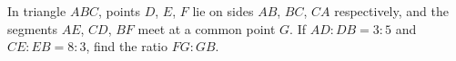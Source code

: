 In triangle $ABC$, points $D$, $E$, $F$ lie on sides $AB$, $BC$, $CA$ respectively, and the segments $AE$, $CD$, $BF$ meet at a common point $G$. If $AD:DB=3:5$ and $CE:EB=8:3$, find the ratio $FG:GB$.
